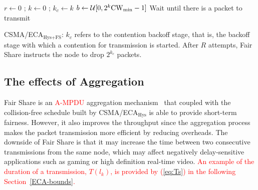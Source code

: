 	\begin{algorithm}[tb]
	{
	  $r \leftarrow 0$ ; $k \leftarrow 0$ ; $k_{c} \leftarrow k$\label{emptyQueue}\;
	  $b \leftarrow \mathcal{U}[0,2^k\rm{CW}_{min}-1]$\;
	  Wait until there is a packet to transmit\;
	}	
	\vspace{0.2cm}
	\caption{CSMA/ECA$_{\text{Hys+FS}}$: $k_{c}$ refers to the contention backoff stage, that is, the backoff stage with which a contention for transmission is started. After $R$ attempts, Fair Share instructs the node to drop $2^{k_{c}}$ packets.}
	\label{alg:fullECA}
	\end{algorithm}


	\subsection{The effects of Aggregation}\label{effects-of-aggregation}
	Fair Share is an \textcolor{red}{A-MPDU} aggregation mechanism~\cite{A-MPDU} that coupled with the collision-free schedule built by CSMA/ECA$_{\text{Hys}}$ is able to provide short-term fairness. However, it also improves the throughput since the aggregation process makes the packet transmission more efficient by reducing overheads. The downside of Fair Share is that it may increase the time between two consecutive transmissions from the same node, which may affect negatively delay-sensitive applications such as gaming or high definition real-time video. \textcolor{red}{An example of the duration of a transmission, $T(l_{k})$, is provided by (\ref{eq:Ts}) in the following Section~\ref{ECA-bounds}.}
	
